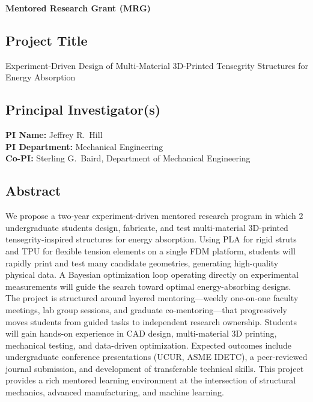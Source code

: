 
\thispagestyle{empty}
\begingroup
\setlength{\parskip}{0.2em}
\titlespacing*{\subsection}{0pt}{0.6em}{0.2em}

\begin{center}
{\Large \textbf{Mentored Research Grant (MRG)}}
\end{center}

\subsection*{Project Title}
Experiment-Driven Design of Multi-Material 3D-Printed Tensegrity Structures for Energy Absorption

\subsection*{Principal Investigator(s)}
\textbf{PI Name:} Jeffrey R.\ Hill \\
\textbf{PI Department:} Mechanical Engineering \\
\textbf{Co-PI:} Sterling G.\ Baird, Department of Mechanical Engineering

\subsection*{Abstract}

We propose a two-year experiment-driven mentored research program in which 2
undergraduate students design, fabricate, and test multi-material 3D-printed
tensegrity-inspired structures for energy absorption.  Using PLA for rigid
struts and TPU for flexible tension elements on a single FDM platform, students
will rapidly print and test many candidate geometries, generating
high-quality physical data.  A Bayesian optimization loop operating
directly on experimental measurements will guide the search toward optimal
energy-absorbing designs.  The project is structured around layered
mentoring---weekly one-on-one faculty meetings, lab group sessions, and
graduate co-mentoring---that progressively moves students from guided tasks
to independent research ownership.  Students will gain hands-on experience in
CAD design, multi-material 3D printing, mechanical testing, and data-driven
optimization.  Expected outcomes include undergraduate conference
presentations (UCUR, ASME IDETC), a peer-reviewed journal submission, and
development of transferable technical skills.  This project provides a rich
mentored learning environment at the intersection of structural mechanics,
advanced manufacturing, and machine learning.

